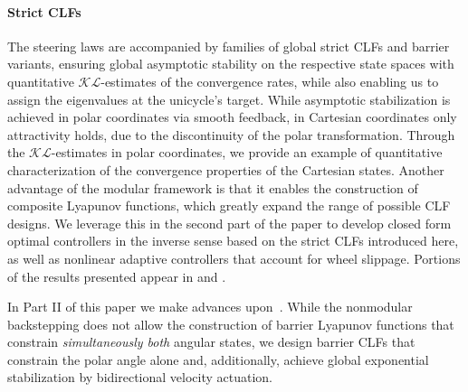 \documentclass[journal,twoside,web]{ieeecolor}
\theoremstyle{definition}
\begin{document}
\paragraph{Strict CLFs} The steering laws are accompanied by families of global strict CLFs and barrier variants, ensuring global asymptotic stability on the respective state spaces with quantitative $\mathcal{KL}$-estimates of the convergence rates, while also enabling us to assign the eigenvalues at the unicycle’s target. While asymptotic stabilization is achieved in polar coordinates via smooth feedback, in Cartesian coordinates only attractivity holds, due to the discontinuity of the polar transformation. Through the $\mathcal{KL}$-estimates in polar coordinates, we provide an example of quantitative characterization of the convergence properties of the Cartesian states. 
Another advantage of the modular framework is that it enables the construction of composite Lyapunov functions, which greatly expand the range of possible CLF designs. We leverage this in the second part of the paper to develop closed form optimal controllers in the inverse sense based on the strict CLFs introduced here, as well as nonlinear adaptive controllers that account for wheel slippage. Portions of the results presented appear in \cite{todorovski2025_CLF} and \cite{Krstic2025_fwd}.

In Part II of this paper \cite{Part2_kim2025} we make advances upon~\cite{restrepo2020leader}. While the nonmodular backstepping does not allow the construction of barrier Lyapunov functions that constrain {\em simultaneously both} angular states,  we design barrier CLFs that constrain the polar angle alone and, additionally, achieve global exponential stabilization by bidirectional  velocity actuation. 

\end{document}
